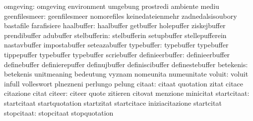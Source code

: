                         omgeving: omgeving                         environment
                                  umgebung                         prostredi
                                  ambiente                         mediu
                   geenfilesmeer: geenfilesmeer                    nomorefiles
                                  keinedateienmehr                 zadnedalsisoubory
                                  bastafile                        farafisiere
                      haalbuffer: haalbuffer                       getbuffer
                                  holepuffer                       ziskejbuffer
                                  prendibuffer                     adubuffer
                    stelbufferin: stelbufferin                     setupbuffer
                                  stellepufferein                  nastavbuffer
                                  impostabuffer                    seteazabuffer
                      typebuffer: typebuffer                       typebuffer
                                  tippepuffer                      typebuffer
                                  typebuffer                       scriebuffer %
                 definieerbuffer: definieerbuffer                  definebuffer
                                  definierepuffer                  definujbuffer
                                  definiscibuffer                  definestebuffer
                       betekenis: betekenis                        unitmeaning
                                  bedeutung                        vyznam
                                  nomeunita                        numeunitate %
                          voluit: voluit                           infull
                                  volleswort                       plnezneni
                                  perlungo                         pelung
                          citaat: citaat                           quotation
                                  zitat                            citace
                                  citazione                        citat
                          citeer: citeer                           quote
                                  zitieren                         citovat
                                  menzione                         minicitat
                     startcitaat: startcitaat                      startquotation
                                  startzitat                       startcitace
                                  iniziacitazione                  startcitat
                      stopcitaat: stopcitaat                       stopquotation

